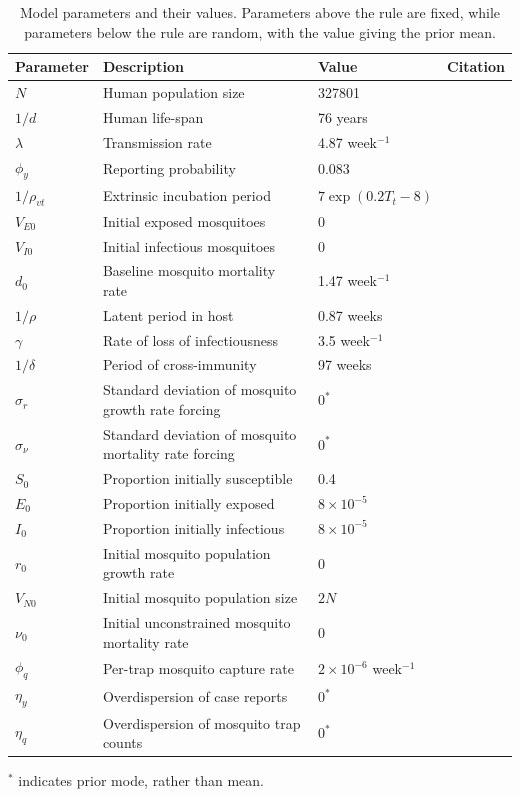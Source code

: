 \documentclass[10pt,letterpaper]{article}
\begin{document}
\begin{table}[!ht]
\label{parameters}
\begin{adjustwidth}{-2.25in}{0in} 
\begin{center}
\caption{Model parameters and their values.  Parameters above the rule are fixed, while parameters below the rule are random, with the value giving the prior mean.}
\begin{tabular}{llll}
Parameter & Description & Value & Citation\\
\hline
$N$ & Human population size & 327801 & \cite{vitpop} \\
$1/d$ & Human life-span & 76 years & \cite{vitlong} \\
$\lambda$ & Transmission rate & 4.87 week$^{-1}$ & \cite{Scott2000}\\
$\phi_y$ & Reporting probability & 0.083 & \cite{Silva2016}\\
$1/\rho_{vt}$ & Extrinsic incubation period & $7\exp \left( 0.2 T_t - 8 \right)$ & \cite{Chan2012}\\
$V_{E0}$ & Initial exposed mosquitoes &  0 & \\
$V_{I0}$ & Initial infectious mosquitoes & 0 & \\
\hline
$d_0$ & Baseline mosquito mortality rate & 1.47 week$^{-1}$ & \cite{Brady2013} \\
$1/\rho$ & Latent period in host & 0.87 weeks  & \cite{Chan2012}\\
$\gamma$ & Rate of loss of infectiousness & 3.5 week$^{-1}$ & \cite{Nguyet2013}\\
$1/\delta$ & Period of cross-immunity & 97 weeks &  \cite{Reich2013}\\
$\sigma_r$ & Standard deviation of mosquito growth rate forcing & $0^*$ & \\
$\sigma_{\nu}$ & Standard deviation of mosquito mortality rate forcing & $0^*$ & \\
$S_0$ & Proportion initially susceptible & 0.4 & \cite{Cardoso2011a} \\
$E_0$ & Proportion initially exposed & $8\times 10 ^ {-5}$ & \\
$I_0$ & Proportion initially infectious & $8\times 10 ^ {-5}$ & \\
$r_0$ & Initial mosquito population growth rate & 0 & \\
$V_{N0}$ & Initial mosquito population size & $2N$ & \\
$\nu_0$ & Initial unconstrained mosquito mortality rate & 0 & \\
$\phi_q$ & Per-trap mosquito capture rate & $2 \times 10^{-6}$ week$^{-1}$ & \\
$\eta_y$ & Overdispersion of case reports & $0^*$ & \\
$\eta_q$ & Overdispersion of mosquito trap counts & $0^*$ & \\
\end{tabular}
\end{center}
\end{adjustwidth}
$^*$ indicates prior mode, rather than mean.
\end{table}
\end{document}
